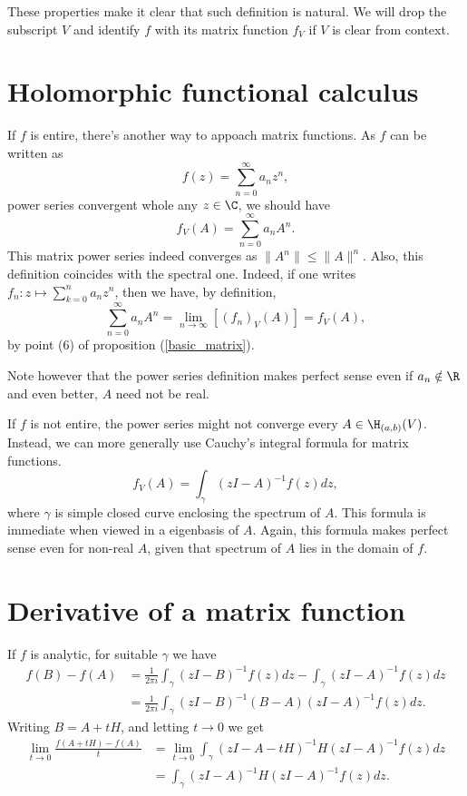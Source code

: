 These properties make it clear that such definition is natural. We will drop the subscript $V$ and identify $f$ with its matrix function $f_{V}$ if $V$ is clear from context.

\section{Holomorphic functional calculus}

If $f$ is entire, there's another way to appoach matrix functions. As $f$ can be written as
\[
	f(z) = \sum_{n = 0}^{\infty} a_{n} z^{n},
\]
power series convergent whole any $z \in \C$, we should have
\[
	f_{V}(A) = \sum_{n = 0}^{\infty} a_{n} A^{n}.
\]
This matrix power series indeed converges as $\|A^{n}\| \leq \|A\|^{n}$. Also, this definition coincides with the spectral one. Indeed, if one writes $f_{n} : z \mapsto  \sum_{k = 0}^{n} a_{n} z^{n}$, then we have, by definition,
\[
	\sum_{n = 0}^{\infty}a_{n} A^{n} = \lim_{n \to \infty} \left[(f_{n})_{V}(A) \right] = f_{V}(A),
\]
by point (6) of proposition (\ref{basic_matrix}).

Note however that the power series definition makes perfect sense even if $a_{n} \notin \R$ and even better, $A$ need not be real.

If $f$ is not entire, the power series might not converge every $A \in \H_{(a, b)}(V)$. Instead, we can more generally use Cauchy's integral formula for matrix functions.
\[
	f_{V}(A) = \int_{\gamma} (z I - A)^{-1} f(z) dz,
\]
where $\gamma$ is simple closed curve enclosing the spectrum of $A$. This formula is immediate when viewed in a eigenbasis of $A$. Again, this formula makes perfect sense even for non-real $A$, given that spectrum of $A$ lies in the domain of $f$.

\section{Derivative of a matrix function}

If $f$ is analytic, for suitable $\gamma$ we have
\begin{align*}
	f(B) - f(A) &= \frac{1}{2 \pi i}\int_{\gamma} (z I - B)^{-1} f(z) dz - \int_{\gamma} (z I - A)^{-1} f(z) dz \\
	&=  \frac{1}{2 \pi i}\int_{\gamma} (z I - B)^{-1} (B - A) (z I - A)^{-1} f(z) dz.
\end{align*}
Writing $B = A + t H$, and letting $t \to 0$ we get
\begin{align*}
	\lim_{t \to 0} \frac{f(A + tH) - f(A)}{t} &= \lim_{t \to 0}\int_{\gamma} (z I - A - t H)^{-1} H (z I - A)^{-1} f(z) dz \\
	&= \int_{\gamma} (z I - A)^{-1} H (z I - A)^{-1} f(z) dz.
\end{align*}

